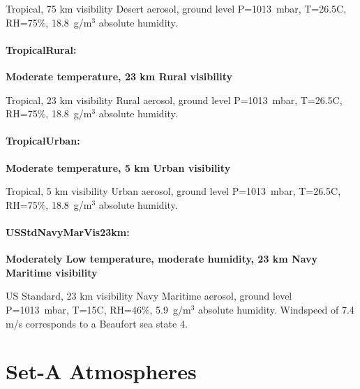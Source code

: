 \documentclass{workpackage}
\begin{document}
Tropical, 75 km visibility  Desert aerosol, ground level P=1013~mbar, T=26.5C, RH=75\%, 18.8~g/m$^3$ absolute humidity.

\subsubsection{TropicalRural:}
\label{sec:TropicalRural}

\textbf{Moderate temperature, 23 km Rural visibility}

Tropical, 23 km visibility  Rural aerosol, ground level P=1013~mbar, T=26.5C, RH=75\%, 18.8~g/m$^3$ absolute humidity.

\subsubsection{TropicalUrban:}
\label{sec:TropicalUrban}

\textbf{Moderate temperature, 5 km Urban visibility}

Tropical, 5 km visibility  Urban aerosol, ground level P=1013~mbar, T=26.5C, RH=75\%, 18.8~g/m$^3$ absolute humidity.

\subsubsection{USStdNavyMarVis23km:}
\label{sec:USStdNavyMarVis23km}

\textbf{Moderately Low temperature, moderate humidity, 23 km Navy Maritime visibility}

US Standard, 23 km visibility  Navy Maritime aerosol, ground level P=1013~mbar, T=15C, RH=46\%, 5.9~g/m$^3$ absolute humidity.  Windspeed of 7.4 m/s corresponds to a Beaufort sea state 4.


\chapter{Set-A Atmospheres}
\label{sec:Set-AAtmospheres}
\end{document}
